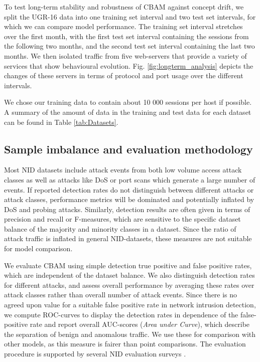 To test long-term stability and robustness of CBAM against concept drift, 
we split the UGR-16 data into one training set interval and two test set intervals, for which we can compare model performance. 
The training set interval stretches over the first month, with the first test set interval containing the sessions from the following two months, and the second test set interval containing the last two months.
We then isolated traffic from five web-servers that provide a variety of services that show behavioural evolution. Fig. \ref{fig:longterm_analysis} depicts the changes of these servers in terms of protocol and port usage over the different intervals.

We chose our training data to contain about 10 000 sessions per host if possible. A summary of the amount of data in the training and test data for each dataset can be found in Table \ref{tab:Datasets}.

\subsection{Sample imbalance and evaluation methodology}


Most NID datasets include attack events from both low volume access attack classes as well as attacks like DoS or port scans which generate a large number of events. 
If reported detection rates do not distinguish between different attacks or attack classes, performance metrics will be dominated and potentially inflated by DoS and probing attacks. 
Similarly, detection results are often given in terms of precision and recall or F-measures, which are sensitive to the specific dataset balance of the majority and minority classes in a dataset. Since the ratio of attack traffic is inflated in general NID-datasets, these measures are not suitable for model comparison. 

We evaluate CBAM using simple detection true positive and false positive rates, which are independent of the dataset balance. We also distinguish detection rates for different attacks, and assess overall performance by averaging these rates over attack classes rather than overall number of attack events. Since there is no agreed upon value for a suitable false positive rate in network intrusion detection, we compute ROC-curves to display the detection rates in dependence of the false-positive rate and report overall AUC-scores (\textit{Area under Curve}), which describe the separation of benign and anomalous traffic. We use these for comparison with other models, as this measure is fairer than point comparisons. The evaluation procedure is supported by several NID evaluation surveys \cite{ulvila2003evaluation,milenkoski2015evaluating}.

